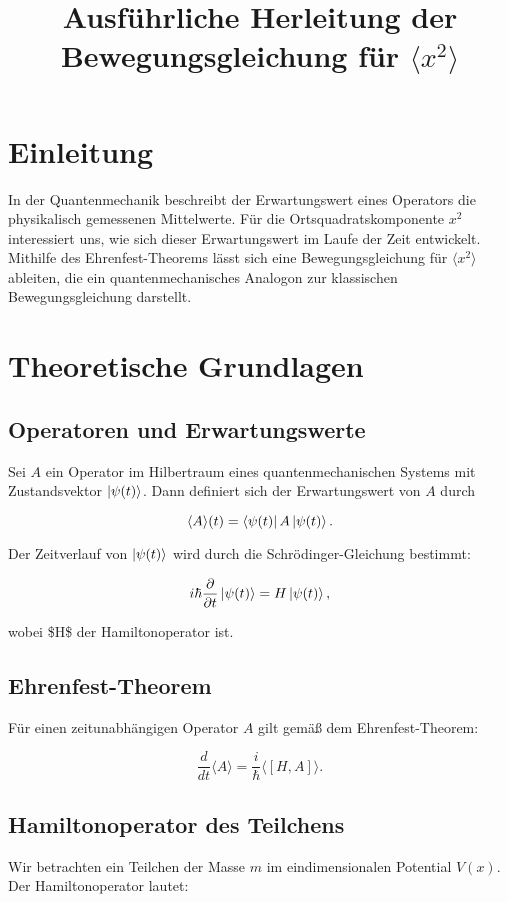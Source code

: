 \documentclass[a4paper,12pt]{article}
\begin{document}
\title{Ausführliche Herleitung der Bewegungsgleichung für $\langle x^2 \rangle$}
\author{}
\date{}
\maketitle

\section*{Einleitung}
In der Quantenmechanik beschreibt der Erwartungswert eines Operators die physikalisch gemessenen Mittelwerte. Für die Ortsquadratskomponente $x^2$ interessiert uns, wie sich dieser Erwartungswert im Laufe der Zeit entwickelt. Mithilfe des Ehrenfest-Theorems lässt sich eine Bewegungsgleichung für $\langle x^2\rangle$ ableiten, die ein quantenmechanisches Analogon zur klassischen Bewegungsgleichung darstellt.

\section{Theoretische Grundlagen}
\subsection{Operatoren und Erwartungswerte}
Sei $A$ ein Operator im Hilbertraum eines quantenmechanischen Systems mit Zustandsvektor $\ket{\psi(t)}$. Dann definiert sich der Erwartungswert von $A$ durch

$$
  \langle A \rangle(t) = \bra{\psi(t)} A \ket{\psi(t)}.
$$

Der Zeitverlauf von $\ket{\psi(t)}$ wird durch die Schrödinger-Gleichung bestimmt:

$$
  i\hbar \frac{\partial}{\partial t} \ket{\psi(t)} = H \ket{\psi(t)},
$$

wobei \$H\$ der Hamiltonoperator ist.

\subsection{Ehrenfest-Theorem}
Für einen zeitunabhängigen Operator $A$ gilt gemäß dem Ehrenfest-Theorem:

$$
  \frac{d}{dt} \langle A \rangle = \frac{i}{\hbar} \langle [H, A] \rangle.
$$

\subsection{Hamiltonoperator des Teilchens}
Wir betrachten ein Teilchen der Masse $m$ im eindimensionalen Potential $V(x)$. Der Hamiltonoperator lautet:
\end{document}
